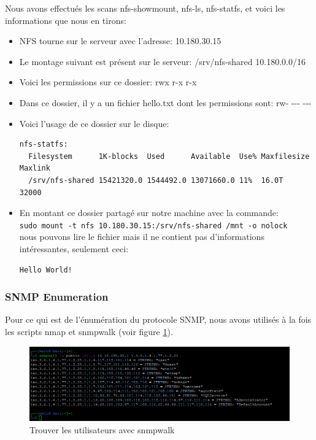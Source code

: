 \documentclass[french,paper=a4,oneside,captions=tableheading]{article}
\begin{document}
Nous avons effectués les scans nfs-showmount, nfs-ls, nfs-statfs, et voici les informations que nous en tirons:
\begin{itemize}
    \item NFS tourne sur le serveur avec l'adresse: 10.180.30.15
    \item Le montage suivant est présent sur le serveur: /srv/nfs-shared 10.180.0.0/16
    \item Voici les permissions sur ce dossier: rwx r-x r-x
    \item Dans ce dossier, il y a un fichier hello.txt dont les permissions sont: rw- -{}-{}- -{}-{}-
    \item Voici l'usage de ce dossier sur le disque:
\begin{example}
\begin{Verbatim}
nfs-statfs: 
  Filesystem      1K-blocks  Used      Available  Use% Maxfilesize Maxlink
  /srv/nfs-shared 15421320.0 1544492.0 13071660.0 11%  16.0T       32000
\end{Verbatim}
\end{example}
    \item En montant ce dossier partagé sur notre machine avec la commande: \\
    \texttt{sudo mount -t nfs 10.180.30.15:/srv/nfs-shared /mnt -o nolock} \\
    nous pouvons lire le fichier mais il ne contient pas d'informations intéressantes, seulement ceci:
\begin{example}
\begin{Verbatim}
Hello World!
\end{Verbatim}
\end{example}
\end{itemize}



\subsubsection{SNMP Enumeration}

Pour ce qui est de l'énumération du protocole SNMP, nous avons utilisés à la fois les scripts nmap et snmpwalk (voir figure \ref{fig:snmpwalk}).

\begin{figure}[H]
    \centering
    \includegraphics[width=17cm]{images/Secu_Offensive_35.png}
    \caption{Trouver les utilisateurs avec snmpwalk}
    \label{fig:snmpwalk}
\end{figure}
\end{document}

